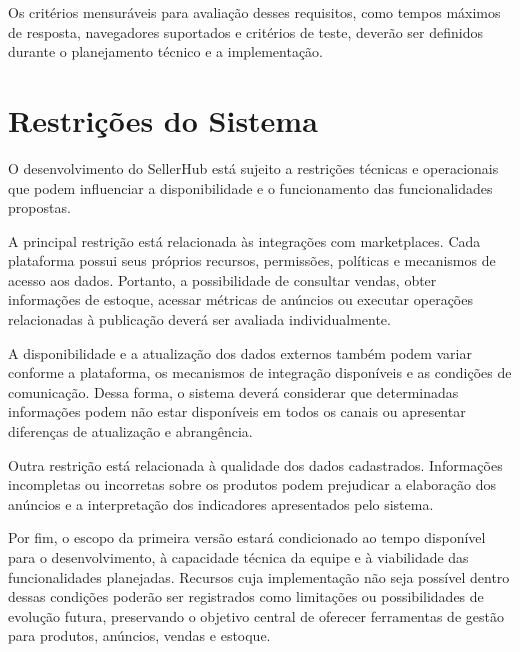 Os critérios mensuráveis para avaliação desses requisitos, como tempos máximos de resposta, navegadores suportados e critérios de teste, deverão ser definidos durante o planejamento técnico e a implementação.

\section{Restrições do Sistema}

O desenvolvimento do SellerHub está sujeito a restrições técnicas e operacionais que podem influenciar a disponibilidade e o funcionamento das funcionalidades propostas.

A principal restrição está relacionada às integrações com marketplaces. Cada plataforma possui seus próprios recursos, permissões, políticas e mecanismos de acesso aos dados. Portanto, a possibilidade de consultar vendas, obter informações de estoque, acessar métricas de anúncios ou executar operações relacionadas à publicação deverá ser avaliada individualmente.

A disponibilidade e a atualização dos dados externos também podem variar conforme a plataforma, os mecanismos de integração disponíveis e as condições de comunicação. Dessa forma, o sistema deverá considerar que determinadas informações podem não estar disponíveis em todos os canais ou apresentar diferenças de atualização e abrangência.

Outra restrição está relacionada à qualidade dos dados cadastrados. Informações incompletas ou incorretas sobre os produtos podem prejudicar a elaboração dos anúncios e a interpretação dos indicadores apresentados pelo sistema.

Por fim, o escopo da primeira versão estará condicionado ao tempo disponível para o desenvolvimento, à capacidade técnica da equipe e à viabilidade das funcionalidades planejadas. Recursos cuja implementação não seja possível dentro dessas condições poderão ser registrados como limitações ou possibilidades de evolução futura, preservando o objetivo central de oferecer ferramentas de gestão para produtos, anúncios, vendas e estoque.